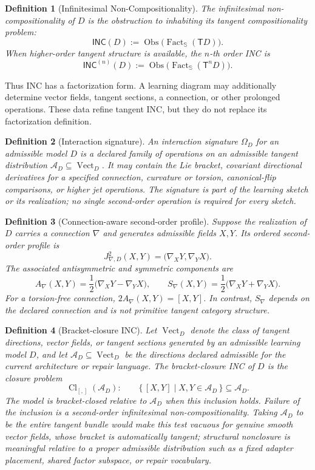 \documentclass{article}
\newtheorem{definition}{Definition}
\newcommand{\T}{\mathsf{T}}
\newcommand{\INC}{\mathsf{INC}}
\newcommand{\Fact}{\operatorname{Fact}}
\newcommand{\Vect}{\operatorname{Vect}}
\newcommand{\Cl}{\operatorname{Cl}}
\newcommand{\Obs}{\operatorname{Obs}}
\begin{document}
\begin{definition}[Infinitesimal Non-Compositionality]
The infinitesimal non-compositionality of \(D\) is the obstruction to inhabiting its tangent compositionality problem:
\[
\INC(D)
  :=
  \Obs\big(\Fact_{\mathbb S}(\T D)\big).
\]
When higher-order tangent structure is available, the \(n\)-th order INC is
\[
\INC^{(n)}(D)
  :=
  \Obs\big(\Fact_{\mathbb S}(\T^n D)\big).
\]
\end{definition}

Thus INC has a factorization form.  A learning diagram may additionally
determine vector fields, tangent sections, a connection, or other prolonged
operations.  These data refine tangent INC, but they do not replace its
factorization definition.

\begin{definition}[Interaction signature]
An interaction signature $\Omega_D$ for an admissible model $D$ is a declared
family of operations on an admissible tangent distribution
$\mathcal A_D\subseteq\Vect_D$.  It may contain the Lie bracket, covariant
directional derivatives for a specified connection, curvature or torsion,
canonical-flip comparisons, or higher jet operations.  The signature is part
of the learning sketch or its realization; no single second-order operation
is required for every sketch.
\end{definition}

\begin{definition}[Connection-aware second-order profile]
Suppose the realization of $D$ carries a connection $\nabla$ and generates
admissible fields $X,Y$.  Its ordered second-order profile is
\[
J^2_{\nabla,D}(X,Y)
  =
  \big(\nabla_XY,\nabla_YX\big).
\]
The associated antisymmetric and symmetric components are
\[
A_\nabla(X,Y)
  =\frac12\big(\nabla_XY-\nabla_YX\big),
\qquad
S_\nabla(X,Y)
  =\frac12\big(\nabla_XY+\nabla_YX\big).
\]
For a torsion-free connection, $2A_\nabla(X,Y)=[X,Y]$.  In contrast,
$S_\nabla$ depends on the declared connection and is not primitive tangent
category structure.
\end{definition}

\begin{definition}[Bracket-closure INC]
Let \(\Vect_D\) denote the class of tangent directions, vector fields, or tangent sections generated by an admissible learning model \(D\), and let
$\mathcal A_D\subseteq\Vect_D$ be the directions declared admissible for the
current architecture or repair language. The bracket-closure INC of \(D\) is the closure problem
\[
\Cl_{[,]}(\mathcal A_D):
\qquad
  \{\, [X,Y]\mid X,Y\in\mathcal A_D\,\}
  \subseteq
  \mathcal A_D.
\]
The model is bracket-closed relative to $\mathcal A_D$ when this inclusion
holds. Failure of the inclusion is a second-order infinitesimal
non-compositionality.  Taking $\mathcal A_D$ to be the entire tangent bundle
would make this test vacuous for genuine smooth vector fields, whose bracket is
automatically tangent; structural nonclosure is meaningful relative to a
proper admissible distribution such as a fixed adapter placement, shared
factor subspace, or repair vocabulary.
\end{definition}
\end{document}
